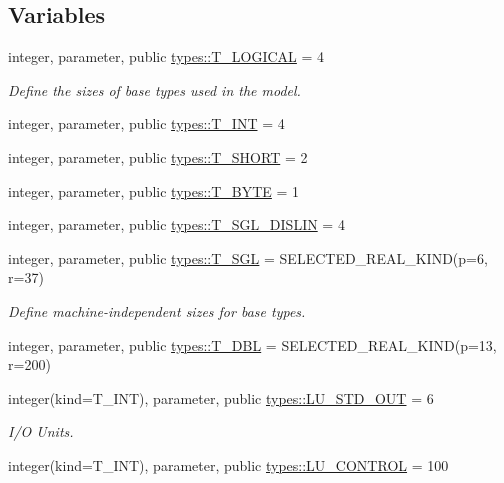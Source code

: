\subsection*{Variables}
\begin{DoxyCompactItemize}
\item 
integer, parameter, public \hyperlink{namespacetypes_adfa8f4f6096bb7bdbb93f36b911dcaad}{types::T\_\-LOGICAL} = 4
\begin{DoxyCompactList}\small\item\em Define the sizes of base types used in the model. \item\end{DoxyCompactList}\item 
integer, parameter, public \hyperlink{namespacetypes_a4e4d040a4425196c4d43be63e7e6103a}{types::T\_\-INT} = 4
\item 
integer, parameter, public \hyperlink{namespacetypes_af6b9654915a854564cb3f5ded061addc}{types::T\_\-SHORT} = 2
\item 
integer, parameter, public \hyperlink{namespacetypes_ac6380d8d9107c7fce9504b0b13552570}{types::T\_\-BYTE} = 1
\item 
integer, parameter, public \hyperlink{namespacetypes_a878c8056dbab71b170f5f7c4c9dd2235}{types::T\_\-SGL\_\-DISLIN} = 4
\item 
integer, parameter, public \hyperlink{namespacetypes_af3012489af4c138f271f1bce244b7e51}{types::T\_\-SGL} = SELECTED\_\-REAL\_\-KIND(p=6, r=37)
\begin{DoxyCompactList}\small\item\em Define machine-\/independent sizes for base types. \item\end{DoxyCompactList}\item 
integer, parameter, public \hyperlink{namespacetypes_a888737411068474a167b1c3e5b579c58}{types::T\_\-DBL} = SELECTED\_\-REAL\_\-KIND(p=13, r=200)
\item 
integer(kind=T\_\-INT), parameter, public \hyperlink{namespacetypes_ad3e7016ccd6fed062fbd4bf477b66a81}{types::LU\_\-STD\_\-OUT} = 6
\begin{DoxyCompactList}\small\item\em I/O Units. \item\end{DoxyCompactList}\item 
integer(kind=T\_\-INT), parameter, public \hyperlink{namespacetypes_acebd133f6b8d69d9ba284172dfba9388}{types::LU\_\-CONTROL} = 100
\item 

\end{DoxyCompactItemize}

